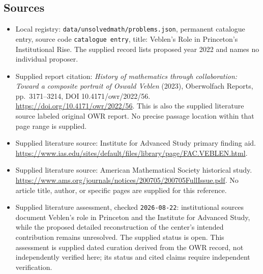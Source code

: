\documentclass[11pt]{article}
\begin{document}
\subsection{Sources}
\begin{itemize}
\item Local registry: \texttt{data/unsolvedmath/problems.json}, permanent catalogue entry, source code \texttt{catalogue entry}, title: Veblen's Role in Princeton's Institutional Rise. The supplied record lists proposed year 2022 and names no individual proposer.
\item Supplied report citation: \emph{History of mathematics through collaboration: Toward a composite portrait of Oswald Veblen} (2023), Oberwolfach Reports, pp.~3171--3214, DOI 10.4171/owr/2022/56. \url{https://doi.org/10.4171/owr/2022/56}. This is also the supplied literature source labeled original OWR report. No precise passage location within that page range is supplied.
\item Supplied literature source: Institute for Advanced Study primary finding aid. \url{https://www.ias.edu/sites/default/files/library/page/FAC.VEBLEN.html}.
\item Supplied literature source: American Mathematical Society historical study. \url{https://www.ams.org/journals/notices/200705/200705FullIssue.pdf}. No article title, author, or specific pages are supplied for this reference.
\item Supplied literature assessment, checked \texttt{2026-08-22}: institutional sources document Veblen's role in Princeton and the Institute for Advanced Study, while the proposed detailed reconstruction of the center's intended contribution remains unresolved. The supplied status is open. This assessment is supplied dated curation derived from the OWR record, not independently verified here; its status and cited claims require independent verification.
\end{itemize}
\end{document}
